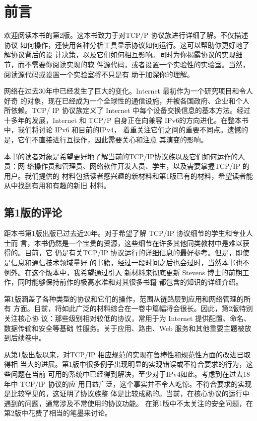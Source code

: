 \chapter*{前言}

欢迎阅读本书的第2版。这本书致力于对TCP/P 协议族进行详细了解。不仅描述协议
如何操作，还使用各种分析工具显示协议如何运行。这可以帮助你更好地了解协议背后的设
计决策，以及它们如何相互影响。同时为你揭露协议的实现细节，而不需要你阅读实现的软
件源代码，或者设置一个实验性的实验室。当然，阅读源代码或设置一个实验室将不只是有
助于加深你的理解。

网络在过去30年中已经发生了巨大的变化。Internet 最初作为一个研究项目和令人好奇
的对象，现在已经成为一个全球性的通信设施，并被各国政府、企业和个人所依赖。TCP/
IP 协议族定义了 Internet 中每个设备交换信息的基本方法。经过十多年的发展，Internet 和
TCP/P 自身正在向兼容 IPv6的方向进化。在整本书中，我们将讨论 IPv6 和目前的IPv4，
着重关注它们之间的重要不同点。遗憾的是，它们不直接进行互操作，因此需要关心和注意
其演变的影响。

本书的读者对象是希望更好地了解当前的TCP/IP协议族以及它们如何运作的人员：网
络操作员和管理员、网络软件开发人员、学生，以及需要掌握TCP/IP 的用户。我们提供的
材料包括读者感兴趣的新材料和第1版已有的材料，希望读者能从中找到有用和有趣的新旧
材料。

\section*{第1版的评论}

距本书第1版出版已过去近20年。对于希望了解 TCP/IP 协议细节的学生和专业人士而
言，本书仍然是一个宝贵的资源，这些细节在许多其他同类教材中是难以获得的。目前，它
仍是有关TCP/IP 协议运行的详细信息的最好参考。但是，即使是信息和通信技术领域量好
的书籍，经过一段时间之后也会过时，当然本书也不例外。在这个版本中，我希望通过引入
新材料来彻底更新 Stevens 博士的前期工作，同时能够保持前作的极高水准和对其很多书籍
都包含的知识的详细介绍。

第1版涵盖了各种类型的协议和它们的操作，范围从链路层到应用和网络管理的所有
方面。目前，将如此广泛的材料综合在一卷中篇幅将会很长。因此，第2版特别关注核心协
议：那些级别相对较低的协议，常用于为 Internet 提供配置、命名、数据传输和安全等基础
性服务。关于应用、路由、Web 服务和其他重要主题被放到后续卷中。

从第1版出版以来，对TCP/IP 相应规范的实现在鲁棒性和规范性方面的改进已取得相
当大的进展。第1版中很多例子出现明显的实现错误或不符合要求的行为，这些问题在当前
可用的系统中已经得到解决，至少对于IPv4如此。考虑到在过去18年中 TCP/IP 协议的应
用日益广泛，这个事实并不令人吃惊。不符合要求的实现是比较罕见的，这证明了协议族整
体是比较成熟的。当前，在核心协议的运行中遇到的问题，通常涉及不常使用的协议功能。
在第1版中不太关注的安全问题，在第2版中花费了相当的笔墨来讨论。

